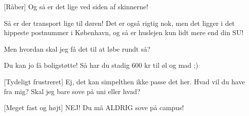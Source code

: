 \documentclass[a4paper,11pt]{article}
\begin{document}
\begin{sketch}

[Råber] Og så er det lige ved siden af skinnerne! 

 Så er der transport lige til døren! Det er også rigtig nok, men det ligger i det hippeste postnummer i København, og så er huslejen kun lidt mere end din SU! 

 Men hvordan skal jeg få det til at løbe rundt så?

 Du kan jo få boligstøtte! Så har du stadig 600 kr til øl og mad ;) 

[Tydeligt frustreret] Ej, det kan simpelthen ikke passe det her. Hvad vil du have fra mig? Skal jeg bare sove på uni eller hvad?


[Meget fast og højt] NEJ! Du må ALDRIG sove på campus!


\end{sketch}
\end{document}
